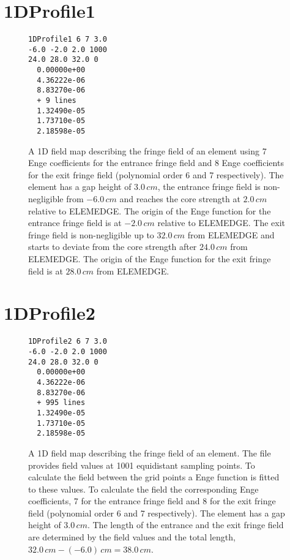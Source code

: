 \section{1DProfile1}
\label{sec:1DProfile1}
\begin{figure}[h]
\label{fig:1DProfile1}
\begin{fmpage}
\begin{verbatim}
1DProfile1 6 7 3.0
-6.0 -2.0 2.0 1000
24.0 28.0 32.0 0
  0.00000e+00  
  4.36222e-06  
  8.83270e-06  
  + 9 lines
  1.32490e-05
  1.73710e-05
  2.18598e-05
\end{verbatim}
\end{fmpage}
\caption[Example of a 1DProfile1 field map]{A 1D field map describing the fringe field of an element using 7 Enge coefficients for the entrance fringe field and 8 Enge coefficients for the exit fringe field (polynomial order 6 and 7 respectively). The element has a gap height of $3.0\,cm$, the entrance fringe field is non-negligible from $-6.0\,cm$ and reaches the core strength at $2.0\,cm$ relative to ELEMEDGE. The origin of the Enge function for the entrance fringe field is at $-2.0\,cm$ relative to ELEMEDGE. The exit fringe field is non-negligible up to $32.0\,cm$ from ELEMEDGE and starts to deviate from the core strength after $24.0\,cm$ from ELEMEDGE. The origin of the Enge function for the exit fringe field is at $28.0\,cm$ from ELEMEDGE.}
\end{figure}
\clearpage

\section{1DProfile2}
\label{sec:1DProfile2}
\begin{figure}[h]
\label{fig:1DProfile2}
\begin{fmpage}
\begin{verbatim}
1DProfile2 6 7 3.0
-6.0 -2.0 2.0 1000
24.0 28.0 32.0 0
  0.00000e+00
  4.36222e-06
  8.83270e-06
  + 995 lines
  1.32490e-05
  1.73710e-05
  2.18598e-05
\end{verbatim}
\end{fmpage}
\caption[Example of a 1DProfile2 field map]{A 1D field map describing the fringe field of an element. The file provides field values at 1001 equidistant sampling points. To calculate the field between the grid points a Enge function is fitted to these values. To calculate the field the corresponding Enge coefficients, 7 for the entrance fringe field and 8 for the exit fringe field (polynomial order 6 and 7 respectively). The element has a gap height of $3.0\,cm$. The length of the entrance and the exit fringe field are determined by the field values and the total length, $32.0\,cm - (-6.0)\,cm = 38.0\,cm$.}
\end{figure}
\clearpage

